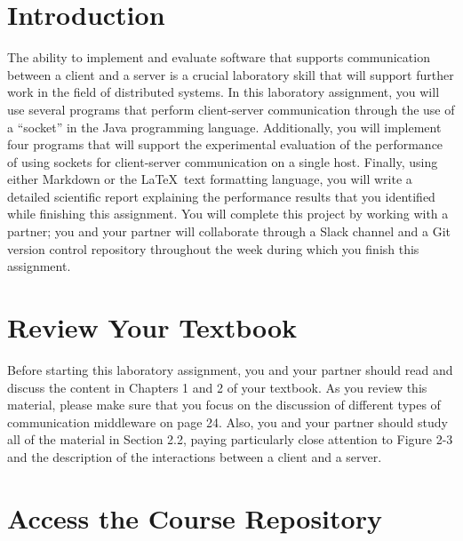 


\usepackage[compact]{titlesec}



\section*{Introduction}

The ability to implement and evaluate software that supports communication between a client and a server is a crucial
laboratory skill that will support further work in the field of distributed systems. In this laboratory assignment, you
will use several programs that perform client-server communication through the use of a ``socket'' in the Java
programming language. Additionally, you will implement four programs that will support the experimental evaluation of
the performance of using sockets for client-server communication on a single host. Finally, using either Markdown or the
\LaTeX~text formatting language, you will write a detailed scientific report explaining the performance results that you
identified while finishing this assignment. You will complete this project by working with a partner; you and your
partner will collaborate through a Slack channel and a Git version control repository throughout the week
during which you finish this assignment.

\section*{Review Your Textbook}

Before starting this laboratory assignment, you and your partner should read and discuss the content in Chapters 1 and 2
of your textbook. As you review this material, please make sure that you focus on the discussion of different types of
communication middleware on page 24. Also, you and your partner should study all of the material in Section 2.2, paying
particularly close attention to Figure 2-3 and the description of the interactions between a client and a server.

\section*{Access the Course Repository}

